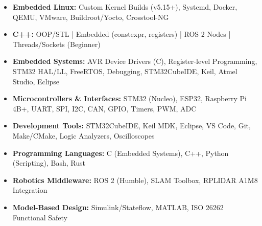 
\begin{itemize}[leftmargin=*,noitemsep,topsep=0pt]

\item \textbf{Embedded Linux:} 
Custom Kernel Builds (v5.15+), Systemd, Docker, QEMU, VMware, Buildroot/Yocto, Crosstool-NG

\item \textbf{C++:} 
OOP/STL | Embedded (constexpr, registers) | ROS 2 Nodes | Threads/Sockets (Beginner)

\item \textbf{Embedded Systems:} 
AVR Device Drivers (C), Register-level Programming, STM32 HAL/LL, FreeRTOS, Debugging, STM32CubeIDE, Keil, Atmel Studio, Eclipse

\item \textbf{Microcontrollers \& Interfaces:} 
STM32 (Nucleo), ESP32, Raspberry Pi 4B+, UART, SPI, I2C, CAN, GPIO, Timers, PWM, ADC

\item \textbf{Development Tools:} 
STM32CubeIDE, Keil MDK, Eclipse, VS Code, Git, Make/CMake, Logic Analyzers, Oscilloscopes

\item \textbf{Programming Languages:} 
C (Embedded Systems), C++, Python (Scripting), Bash, Rust

\item \textbf{Robotics Middleware:} 
ROS 2 (Humble), SLAM Toolbox, RPLIDAR A1M8 Integration

\item \textbf{Model-Based Design:} 
Simulink/Stateflow, MATLAB, ISO 26262 Functional Safety

\end{itemize}